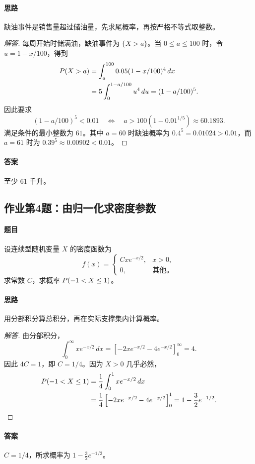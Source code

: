 \paragraph{思路} 缺油事件是销售量超过储油量，先求尾概率，再按严格不等式取整数。
\begin{proof}[解答]
每周开始时储满油，缺油事件为 $\{X>a\}$。当 $0\leq a\leq100$ 时，令 $u=1-x/100$，得到
\begin{align*}
\P(X>a)
&=\int_a^{100}0.05(1-x/100)^4\,dx\\
&=5\int_0^{1-a/100}u^4\,du
=(1-a/100)^5.
\end{align*}
因此要求
\[
(1-a/100)^5<0.01
\quad\Longleftrightarrow\quad
a>100(1-0.01^{1/5})\approx60.1893.
\]
满足条件的最小整数为 $61$。其中 $a=60$ 时缺油概率为 $0.4^5=0.01024>0.01$，而 $a=61$ 时为 $0.39^5\approx0.00902<0.01$。
\end{proof}
\paragraph{答案} 至少 $61$ 千升。

\subsection{作业第4题：由归一化求密度参数}\label{ex:w07-h4}
\paragraph{题目}
设连续型随机变量 $X$ 的密度函数为
\[
f(x)=\begin{cases}Cxe^{-x/2},&x>0,\\0,&\text{其他。}\end{cases}
\]
求常数 $C$，求概率 $\P(-1<X\leq1)$。
\paragraph{思路} 用分部积分算总积分，再在实际支撑集内计算概率。
\begin{proof}[解答]
由分部积分，
\[
\int_0^{\infty}xe^{-x/2}\,dx
=\left[-2xe^{-x/2}-4e^{-x/2}\right]_0^{\infty}=4.
\]
因此 $4C=1$，即 $C=1/4$。因为 $X>0$ 几乎必然，
\begin{align*}
\P(-1<X\leq1)
&=\frac14\int_0^1xe^{-x/2}\,dx\\
&=\frac14\left[-2xe^{-x/2}-4e^{-x/2}\right]_0^1
=1-\frac32e^{-1/2}.
\end{align*}
\end{proof}
\paragraph{答案} $C=1/4$，所求概率为 $1-\tfrac32e^{-1/2}$。
